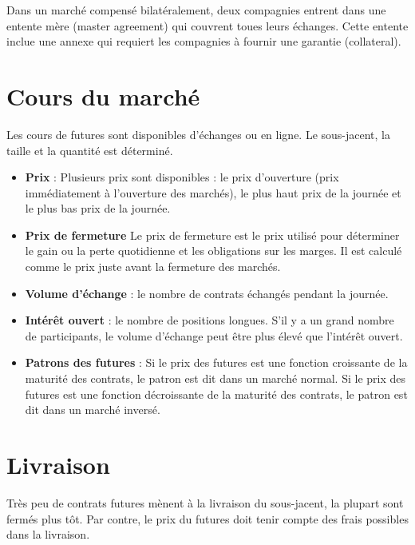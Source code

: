 Dans un marché compensé bilatéralement, deux compagnies entrent dans une entente mère (master agreement) qui couvrent toues leurs échanges. Cette entente inclue une annexe qui requiert les compagnies à fournir une garantie (collateral). 

\section{Cours du marché}

Les cours de futures sont disponibles d'échanges ou en ligne. Le sous-jacent, la taille et la quantité est déterminé. 

\begin{itemize}
	\item \textbf{Prix} : Plusieurs prix sont disponibles : le prix d'ouverture (prix immédiatement à l'ouverture des marchés), le plus haut prix de la journée et le plus bas prix de la journée. 
	\item \textbf{Prix de fermeture} Le prix de fermeture est le prix utilisé pour déterminer le gain ou la perte quotidienne et les obligations sur les marges. Il est calculé comme le prix juste avant la fermeture des marchés. 
	\item \textbf{Volume d'échange} : le nombre de contrats échangés pendant la journée. 
	\item \textbf{Intérêt ouvert} : le nombre de positions longues. S'il y a un grand nombre de participants, le volume d'échange peut être plus élevé que l'intérêt ouvert. 
	\item \textbf{Patrons des futures} : Si le prix des futures est une fonction croissante de la maturité des contrats, le patron est dit dans un marché normal. Si le prix des futures est une fonction décroissante de la maturité des contrats, le patron est dit dans un marché inversé. 
\end{itemize}

\section{Livraison}

Très peu de contrats futures mènent à la livraison du sous-jacent, la plupart sont fermés plus tôt. Par contre, le prix du futures doit tenir compte des frais possibles dans la livraison. 

